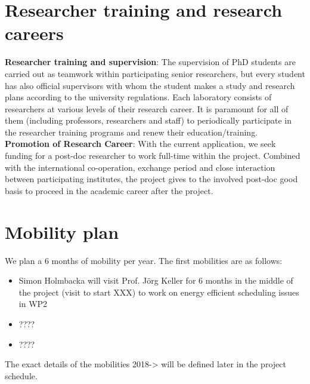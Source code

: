 \documentclass{article}
\begin{document}
\section{Researcher training and research careers}
\textbf{Researcher training and supervision}: The supervision of PhD students are carried out as teamwork within participating senior researchers, 
but every student has also official supervisors with whom the student makes a study and research plans according to the university regulations. 
Each laboratory consists of researchers at various levels of their research career. 
It is paramount for all of them (including professors, researchers and staff) to periodically participate in the researcher training programs and renew their education/training.\\ 
\textbf{Promotion of Research Career}: With the current application, we seek funding for a post-doc researcher to work full-time within the project. 
Combined with the international co-operation, exchange period and close interaction between participating institutes, the project gives to the involved post-doc good basis to proceed in the academic career after the project.

\section{Mobility plan}
We plan a 6 months of mobility per year. The first mobilities are as follows:
\begin{itemize}
 \item Simon Holmbacka will visit Prof. Jörg Keller for 6 months in the middle
of the project (visit to start XXX) to work on energy efficient scheduling issues in WP2
\item ????
\item ????

\end{itemize}


The exact details of the mobilities 2018-> will be defined later in the project
schedule.






\end{document}
